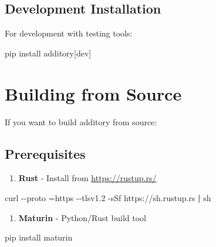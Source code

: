 \documentclass[
  letterpaper,
]{scrbook}
\newenvironment{Shaded}{\begin{snugshade}}{\end{snugshade}}
\newcommand{\AttributeTok}[1]{\textcolor[rgb]{0.40,0.45,0.13}{#1}}
\newcommand{\ExtensionTok}[1]{\textcolor[rgb]{0.00,0.23,0.31}{#1}}
\newcommand{\FunctionTok}[1]{\textcolor[rgb]{0.28,0.35,0.67}{#1}}
\newcommand{\KeywordTok}[1]{\textcolor[rgb]{0.00,0.23,0.31}{\textbf{#1}}}
\newcommand{\NormalTok}[1]{\textcolor[rgb]{0.00,0.23,0.31}{#1}}
\newcommand{\PreprocessorTok}[1]{\textcolor[rgb]{0.68,0.00,0.00}{#1}}
\newcommand{\SpecialStringTok}[1]{\textcolor[rgb]{0.13,0.47,0.30}{#1}}
\newcommand{\StringTok}[1]{\textcolor[rgb]{0.13,0.47,0.30}{#1}}
\providecommand{\tightlist}{%
  \setlength{\itemsep}{0pt}\setlength{\parskip}{0pt}}
\begin{document}
\subsection{Development Installation}\label{development-installation}

For development with testing tools:

\begin{Shaded}
\begin{Highlighting}[]
\ExtensionTok{pip}\NormalTok{ install additory}\PreprocessorTok{[}\SpecialStringTok{dev}\PreprocessorTok{]}
\end{Highlighting}
\end{Shaded}

\section{Building from Source}\label{building-from-source}

If you want to build additory from source:

\subsection{Prerequisites}\label{prerequisites}

\begin{enumerate}
\def\labelenumi{\arabic{enumi}.}
\tightlist
\item
  \textbf{Rust} - Install from \url{https://rustup.rs/}
\end{enumerate}

\begin{Shaded}
\begin{Highlighting}[]
\ExtensionTok{curl} \AttributeTok{{-}{-}proto} \StringTok{\textquotesingle{}=https\textquotesingle{}} \AttributeTok{{-}{-}tlsv1.2} \AttributeTok{{-}sSf}\NormalTok{ https://sh.rustup.rs }\KeywordTok{|} \FunctionTok{sh}
\end{Highlighting}
\end{Shaded}

\begin{enumerate}
\def\labelenumi{\arabic{enumi}.}
\setcounter{enumi}{1}
\tightlist
\item
  \textbf{Maturin} - Python/Rust build tool
\end{enumerate}

\begin{Shaded}
\begin{Highlighting}[]
\ExtensionTok{pip}\NormalTok{ install maturin}
\end{Highlighting}
\end{Shaded}
\end{document}
